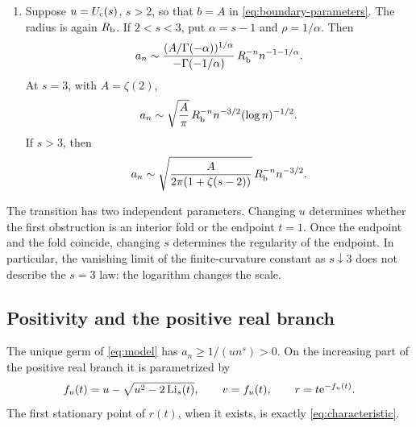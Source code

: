 \begin{theorem}
\begin{enumerate}
\item Suppose $u=U_{\mathrm c}(s)$, $s>2$, so that $b=A$ in
\eqref{eq:boundary-parameters}.  The radius is again $R_{\mathrm b}$.  If
$2<s<3$, put $\alpha=s-1$ and $\rho=1/\alpha$.  Then
\begin{equation}\label{eq:critical-stable}
 a_n\sim
 \frac{(A/\Gamma(-\alpha))^{1/\alpha}}{-\Gamma(-1/\alpha)}
 \,R_{\mathrm b}^{-n}n^{-1-1/\alpha}.
\end{equation}
At $s=3$, with $A=\zeta(2)$,
\begin{equation}\label{eq:critical-log}
 a_n\sim\sqrt{\frac A\pi}\,
 R_{\mathrm b}^{-n}n^{-3/2}(\log n)^{-1/2}.
\end{equation}
If $s>3$, then
\begin{equation}\label{eq:critical-gaussian}
 a_n\sim
 \sqrt{\frac{A}{2\pi(1+\zeta(s-2))}}\,
 R_{\mathrm b}^{-n}n^{-3/2}.
\end{equation}
\end{enumerate}
\end{theorem}

The transition has two independent parameters.  Changing $u$ determines
whether the first obstruction is an interior fold or the endpoint
$t=1$.  Once the endpoint and the fold coincide, changing $s$ determines
the regularity of the endpoint.  In particular, the vanishing limit of
the finite-curvature constant as $s\downarrow3$ does not describe the
$s=3$ law: the logarithm changes the scale.

\subsection{Positivity and the positive real branch}

\begin{lemma}\label{lem:positive}
The unique germ of \eqref{eq:model} has $a_n\ge1/(un^s)>0$.
On the increasing part of the positive real branch it is parametrized by
\begin{equation}\label{eq:parametrization}
 f_u(t)=u-\sqrt{u^2-2\operatorname{Li}_s(t)},\qquad
 v=f_u(t),\qquad r=t\mathrm e^{-f_u(t)}.
\end{equation}
The first stationary point of $r(t)$, when it exists, is exactly
\eqref{eq:characteristic}.
\end{lemma}

